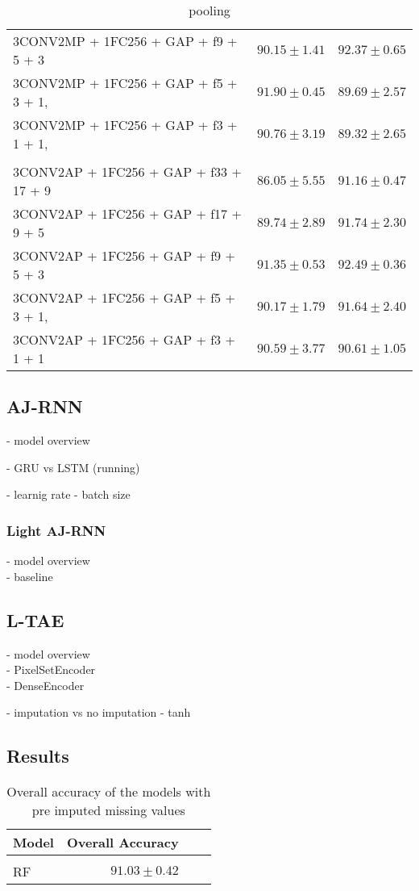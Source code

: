 \begin{table}[!htbp]
\begin{tabular}{lrr}
    3CONV2MP + 1FC256 + GAP + f9 + 5 + 3  	 & $90.15 \pm 1.41$ 	 & $92.37 \pm 0.65$\\
    3CONV2MP + 1FC256 + GAP + f5 + 3 + 1,  	 & $91.90 \pm 0.45$ 	 & $89.69 \pm 2.57$\\
    3CONV2MP + 1FC256 + GAP + f3 + 1 + 1,  	 & $90.76 \pm 3.19$ 	 & $89.32 \pm 2.65$
    \\[0.2cm] \hline \\[-0.2cm]
    3CONV2AP + 1FC256 + GAP + f33 + 17 + 9  	 & $86.05 \pm 5.55$ 	 & $91.16 \pm 0.47$\\
    3CONV2AP + 1FC256 + GAP + f17 + 9 + 5  	 & $89.74 \pm 2.89$ 	 & $91.74 \pm 2.30$\\
    3CONV2AP + 1FC256 + GAP + f9 + 5 + 3  	 & $91.35 \pm 0.53$ 	 & $92.49 \pm 0.36$\\
    3CONV2AP + 1FC256 + GAP + f5 + 3 + 1,  	 & $90.17 \pm 1.79$ 	 & $91.64 \pm 2.40$\\
    3CONV2AP + 1FC256 + GAP + f3 + 1 + 1  	 & $90.59 \pm 3.77$ 	 & $90.61 \pm 1.05$\\
   \end{tabular}
   \caption{pooling}
 \end{table}
 

\pagebreak
\subsection{AJ-RNN}
- model overview

- GRU vs LSTM (running)

- learnig rate
- batch size 

\subsubsection{Light AJ-RNN}
- model overview\\
- baseline

\subsection{L-TAE}
- model overview\\
- PixelSetEncoder\\
- DenseEncoder

- imputation vs no imputation
- tanh

\subsection{Results}

\begin{table}[!htbp]
  \centering
    \begin{tabular}{lrrr}
    Model                       & Overall Accuracy             \\[0.2cm] 
    \hline \\[-0.2cm]
    RF      & $91.03 \pm 0.42$
    \end{tabular}
  \caption{Overall accuracy of the models with pre imputed missing values} 
\end{table}

